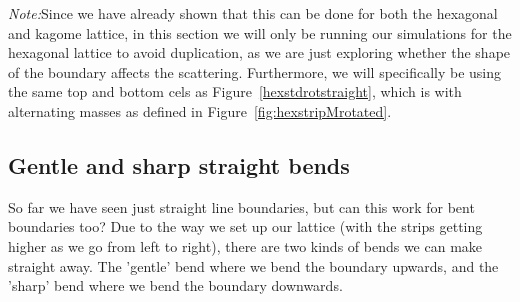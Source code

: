 \textit{Note:}Since we have already shown that this can be done for both the
hexagonal and kagome lattice, in this section we will only be running our
simulations for the hexagonal lattice to avoid duplication, as we are just
exploring whether the shape of the boundary affects the scattering.
Furthermore, we will specifically be using the same top and bottom cels as
Figure~\ref{hexstdrotstraight}, which is with alternating masses as defined in
Figure~\ref{fig:hexstripMrotated}.

\subsection{Gentle and sharp straight bends}
So far we have seen just straight line boundaries, but can this work for bent
boundaries too? Due to the way we set up our lattice (with the strips getting
higher as we go from left to right), there are two kinds of bends we can make
straight away. The 'gentle' bend where we bend the boundary upwards, and the
'sharp' bend where we bend the boundary downwards.

